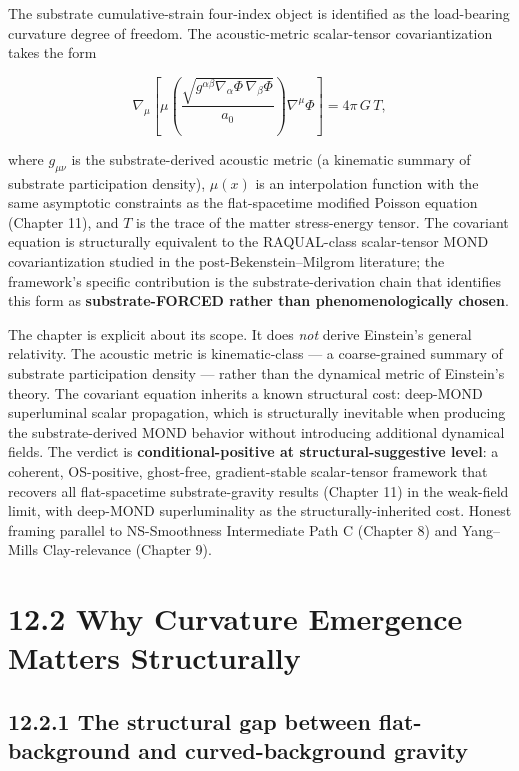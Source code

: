 \documentclass[11pt]{book}
\begin{document}
The substrate cumulative-strain four-index object is identified as the load-bearing curvature degree of freedom. The acoustic-metric scalar-tensor covariantization takes the form

\[
\nabla_\mu\!\left[\mu\!\left(\frac{\sqrt{g^{\alpha\beta}\nabla_\alpha\Phi\,\nabla_\beta\Phi}}{a_0}\right)\nabla^\mu\Phi\right] = 4\pi\,G\,T,
\]

where $g_{\mu\nu}$ is the substrate-derived acoustic metric (a kinematic summary of substrate participation density), $\mu(x)$ is an interpolation function with the same asymptotic constraints as the flat-spacetime modified Poisson equation (Chapter 11), and $T$ is the trace of the matter stress-energy tensor. The covariant equation is structurally equivalent to the RAQUAL-class scalar-tensor MOND covariantization studied in the post-Bekenstein–Milgrom literature; the framework's specific contribution is the substrate-derivation chain that identifies this form as \textbf{substrate-FORCED rather than phenomenologically chosen}.

The chapter is explicit about its scope. It does \textit{not} derive Einstein's general relativity. The acoustic metric is kinematic-class — a coarse-grained summary of substrate participation density — rather than the dynamical metric of Einstein's theory. The covariant equation inherits a known structural cost: deep-MOND superluminal scalar propagation, which is structurally inevitable when producing the substrate-derived MOND behavior without introducing additional dynamical fields. The verdict is \textbf{conditional-positive at structural-suggestive level}: a coherent, OS-positive, ghost-free, gradient-stable scalar-tensor framework that recovers all flat-spacetime substrate-gravity results (Chapter 11) in the weak-field limit, with deep-MOND superluminality as the structurally-inherited cost. Honest framing parallel to NS-Smoothness Intermediate Path C (Chapter 8) and Yang–Mills Clay-relevance (Chapter 9).

\section{12.2 Why Curvature Emergence Matters Structurally}

\subsection{12.2.1 The structural gap between flat-background and curved-background gravity}
\end{document}
